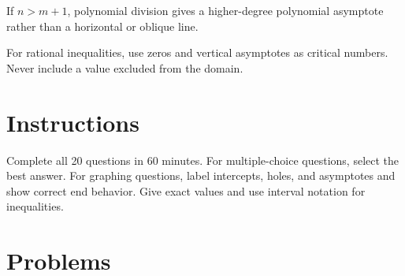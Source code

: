 \documentclass[12pt]{article}
\begin{document}
If $n>m+1$, polynomial division gives a higher-degree polynomial asymptote rather than a horizontal or oblique line.

For rational inequalities, use zeros and vertical asymptotes as critical numbers. Never include a value excluded from the domain.

\clearpage
\section*{Instructions}
Complete all 20 questions in 60 minutes. For multiple-choice questions, select the best answer. For graphing questions, label intercepts, holes, and asymptotes and show correct end behavior. Give exact values and use interval notation for inequalities.

\section*{Problems}
\end{document}
